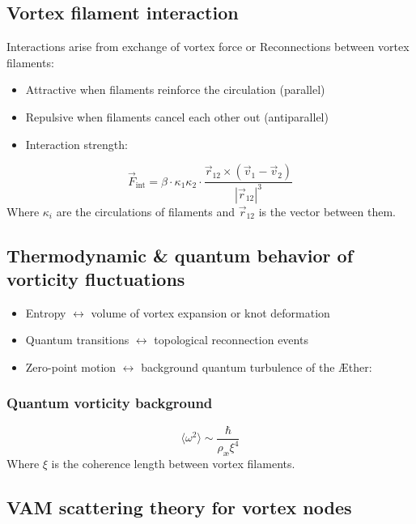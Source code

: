 \documentclass[preprint]{revtex4-2}
\begin{document}
\subsection{Vortex filament interaction}
Interactions arise from exchange of vortex force or Reconnections between vortex filaments:
\begin{itemize}
    \item Attractive when filaments reinforce the circulation (parallel)
    \item Repulsive when filaments cancel each other out (antiparallel)
    \item Interaction strength:
\end{itemize}
\begin{equation}
    \vec{F}_\text{int} = \beta \cdot \kappa_1 \kappa_2 \cdot \frac{\vec{r}_{12} \times (\vec{v}_1 - \vec{v}_2)}{|\vec{r}_{12}|^3}\label{eq:interaction_strength}
\end{equation}
Where \(\kappa_i\) are the circulations of filaments and \(\vec{r}_{12}\) is the vector between them.

\subsection{Thermodynamic \& quantum behavior of vorticity fluctuations}
\begin{itemize}
    \item Entropy \(\leftrightarrow\) volume of vortex expansion or knot deformation
    \item Quantum transitions \(\leftrightarrow\) topological reconnection events
    \item Zero-point motion \(\leftrightarrow\) background quantum turbulence of the Æther:
\end{itemize}

\subsubsection*{Quantum vorticity background}
\begin{equation}
    \langle \omega^2 \rangle \sim \frac{\hbar}{\rho_\text{æ} \xi^4}\label{eq:quantum_vorticity_background}
\end{equation}
Where \(\xi\) is the coherence length between vortex filaments.

\subsection{VAM scattering theory for vortex nodes}
\end{document}

